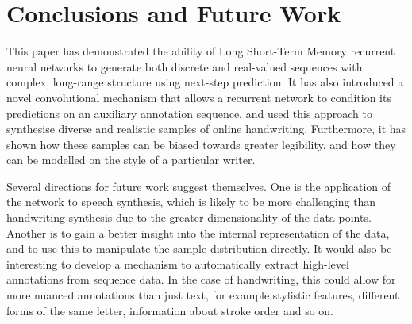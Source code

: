 
\section{Conclusions and Future Work}
\label{sec:conclusion}
This paper has demonstrated the ability of Long Short-Term Memory recurrent neural networks to generate both discrete and real-valued sequences with complex, long-range structure using next-step prediction. It has also introduced a novel convolutional mechanism that allows a recurrent network to condition its predictions on an auxiliary annotation sequence, and used this approach to synthesise diverse and realistic samples of online handwriting. Furthermore, it has shown how these samples can be biased towards greater legibility, and how they can be modelled on the style of a particular writer.

Several directions for future work suggest themselves. One is the application of the network to speech synthesis, which is likely to be more challenging than handwriting synthesis due to the greater dimensionality of the data points. Another is to gain a better insight into the internal representation of the data, and to use this to manipulate the sample distribution directly. It would also be interesting to develop a mechanism to automatically extract high-level annotations from sequence data. In the case of handwriting, this could allow for more nuanced annotations than just text, for example stylistic features, different forms of the same letter, information about stroke order and so on.


